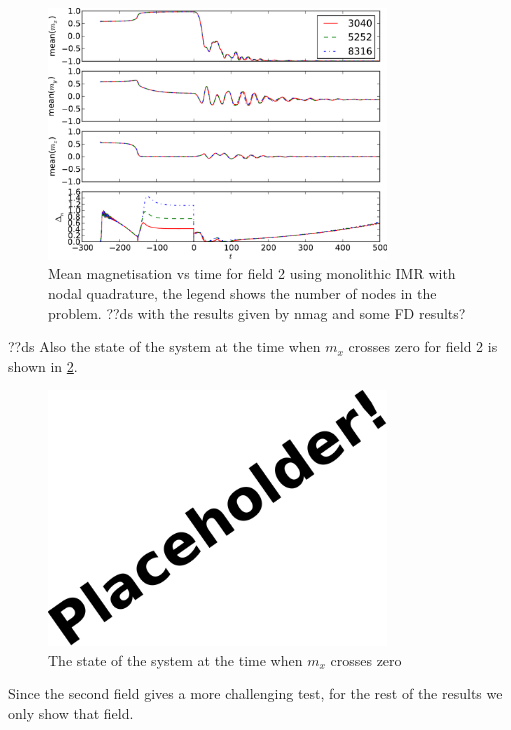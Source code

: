 \begin{figure}
  \centering
  \includegraphics[width=0.8\textwidth]{plots/mumag4_convergence/mumag4_field2-meanmxsvs-meanmysvs-meanmzsvs-dtsvstimes.pdf}
  \caption{Mean magnetisation vs time for field 2 using monolithic IMR with nodal quadrature, the legend shows the number of nodes in the problem.
    ??ds with the results given by nmag and some FD results?
  }
  \label{fig:nmag-comparison-mumag4-field2}
\end{figure}

??ds
Also the state of the system at the time when $m_x$ crosses zero for field 2 is shown in \cref{fig:mumag4-spatial-x-crossing-0}.

\begin{figure}
  \centering
  \includegraphics[width=0.8\textwidth]{images/placeholder}
  \caption{The state of the system at the time when $m_x$ crosses zero}
  \label{fig:mumag4-spatial-x-crossing-0}
\end{figure}


Since the second field gives a more challenging test, for the rest of the results we only show that field.

